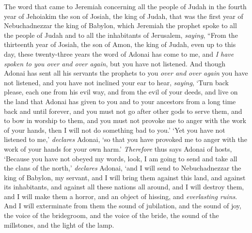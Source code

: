 \begin{biblechapter} %
 The word that came to Jeremiah concerning all the people of Judah in the fourth year of Jehoiakim the son of Josiah, the king of Judah, that was the first year of Nebuchadnezzar the king of Babylon,
\verse which Jeremiah the prophet spoke to all the people of Judah and to all the inhabitants of Jerusalem, \textit{saying},
\verse “From the thirteenth year of Josiah, the son of Amon, the king of Judah, even up to this day, these twenty-three years the word of Adonai has come to me, and \textit{I have spoken to you over and over again}, but you have not listened.
\verse And though Adonai has sent all his servants the prophets to you \textit{over and over again} you have not listened, and you have not inclined your ear to hear,
\verse \textit{saying}, ‘Turn back please, each one from his evil way, and from the evil of your deeds, and live on the land that Adonai has given to you and to your ancestors from a long time back and until forever,
\verse and you must not go after other gods to serve them, and to bow in worship to them, and you must not provoke me to anger with the work of your hands, then I will not do something bad to you.’
\verse ‘Yet you have not listened to me,’ \textit{declares} Adonai, ‘so that you have provoked me to anger with the work of your hands for your own harm.’
\verse \textit{Therefore} thus says Adonai of hosts, ‘Because you have not obeyed my words,
\verse look, I am going to send and take all the clans of the north,’ \textit{declares} Adonai, ‘and I will send to Nebuchadnezzar the king of Babylon, my servant, and I will bring them against this land, and against its inhabitants, and against all these nations all around, and I will destroy them, and I will make them a horror, and an object of hissing, and \textit{everlasting ruins}.
\verse And I will exterminate from them the sound of jubilation, and the sound of joy, the voice of the bridegroom, and the voice of the bride, the sound of the millstones, and the light of the lamp.

\end{biblechapter}
